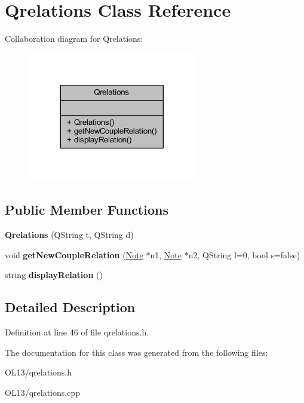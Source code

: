\hypertarget{class_qrelations}{}\section{Qrelations Class Reference}
\label{class_qrelations}


Collaboration diagram for Qrelations\+:
\nopagebreak
\begin{figure}[H]
\begin{center}
\leavevmode
\includegraphics[width=209pt]{class_qrelations__coll__graph}
\end{center}
\end{figure}
\subsection*{Public Member Functions}
\begin{DoxyCompactItemize}
\item 
\mbox{\label{class_qrelations_a72cdb149d1aca6aadd2c69af35fd6327}} 
{\bfseries Qrelations} (Q\+String t, Q\+String d)
\item 
\mbox{\label{class_qrelations_a5811cf8d362be772d2891fce3b821e97}} 
void {\bfseries get\+New\+Couple\+Relation} (\hyperlink{class_note}{Note} $\ast$n1, \hyperlink{class_note}{Note} $\ast$n2, Q\+String l=0, bool s=false)
\item 
\mbox{\label{class_qrelations_ab8ae416ea63621095fa90508f795b80e}} 
string {\bfseries display\+Relation} ()
\end{DoxyCompactItemize}


\subsection{Detailed Description}


Definition at line 46 of file qrelations.\+h.



The documentation for this class was generated from the following files\+:\begin{DoxyCompactItemize}
\item 
O\+L13/qrelations.\+h\item 
O\+L13/qrelations.\+cpp\end{DoxyCompactItemize}
